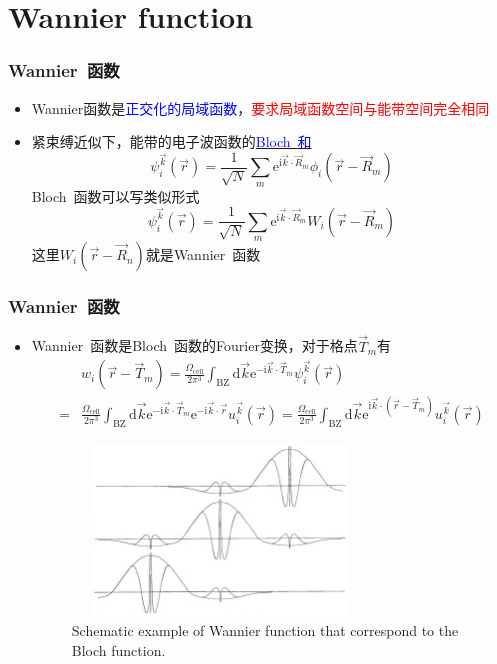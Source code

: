 \documentclass[cjk,slidestop,compress,mathserif,blue]{beamer}
\begin{document}
\section{\rm{Wannier function}}
\frame
{
	\frametitle{\textrm{Wannier~}函数}
	\begin{itemize}
		\item \textrm{Wannier}函数是\textcolor{blue}{正交化的局域函数}，\textcolor{red}{要求局域函数空间与能带空间完全相同}
		\item 紧束缚近似下，能带的电子波函数的\underline{\textcolor{blue}{\textrm{Bloch~}和}}
			\begin{displaymath}
				\psi_i^{\vec k}(\vec r)=\frac1{\sqrt N}\sum_m\mathrm{e}^{\mathrm{i}\vec k\cdot\vec R_m}\phi_i(\vec r-\vec R_m)
			\end{displaymath}
		\textrm{Bloch~}函数可以写类似形式
		\begin{displaymath}
			\psi_i^{\vec k}(\vec r)=\frac1{\sqrt N}\sum_m\mathrm{e}^{\mathrm{i}\vec k\cdot\vec R_m}W_i(\vec r-\vec R_m) 
		\end{displaymath}
		这里$W_i(\vec r-\vec R_n)$就是\textrm{Wannier~}函数
	\end{itemize}
}

\frame
{
	\frametitle{\textrm{Wannier~}函数}
	\begin{itemize}
		\item \textrm{Wannier~}函数是\textrm{Bloch~}函数的\textrm{Fourier}变换，对于格点$\vec T_m$有
			\begin{displaymath}
				\begin{aligned}
					&w_i(\vec r-\vec T_m)=\frac{\Omega_{\mathrm{cell}}}{2\pi^3}\int_{\mathrm{BZ}}\mathrm{d}\vec k\mathrm{e}^{-\mathrm{i}\vec k\cdot\vec T_m}\psi_i^{\vec k}(\vec r)\\
					=&\frac{\Omega_{\mathrm{cell}}}{2\pi^3}\int_{\mathrm{BZ}}\mathrm{d}\vec k\mathrm{e}^{-\mathrm{i}\vec k\cdot\vec T_m}\mathrm{e}^{-\mathrm{i}\vec k\cdot\vec r}u_i^{\vec k}(\vec r)=\frac{\Omega_{\mathrm{cell}}}{2\pi^3}\int_{\mathrm{BZ}}\mathrm{d}\vec k\mathrm{e}^{\mathrm{i}\vec k\cdot(\vec r-\vec T_m)}u_i^{\vec k}(\vec r)
				\end{aligned}
			\end{displaymath}
\begin{figure}[h!]
\centering
\vspace*{-0.6in}
\includegraphics[height=1.8in,width=3.1in,viewport=0 0 1400 1000,clip]{Figures/Wannier_function.png}
\caption{\tiny \textrm{Schematic example of Wannier function that correspond to the Bloch function.}}%
\label{Wannier-function}
\end{figure} 
	\end{itemize}
}
\end{document}

